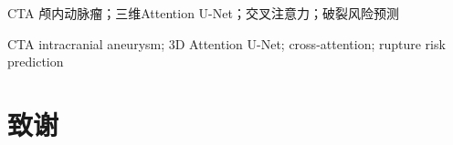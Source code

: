 \documentclass[UTF8,a4paper,12pt,fontset=none,linespread=1,oneside]{ctexart}
\begin{document}
\CQUmakecover
\CQUfrontmatter

\begin{CQUChineseAbstract}{CTA 颅内动脉瘤；三维Attention U-Net；交叉注意力；破裂风险预测}

\end{CQUChineseAbstract}

\begin{CQUEnglishAbstract}{CTA intracranial aneurysm; 3D Attention U-Net;  cross-attention; rupture risk prediction}

\end{CQUEnglishAbstract}

\CQUtableofcontents
\CQUmainmatter







\CQUprintbibliography

\newpage
{}


\newpage
{}
\CQUblankline
\section*{致\quad 谢}
\CQUblankline


\CQUmakedeclaration
\end{document}

